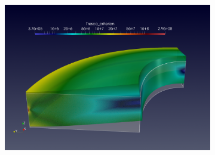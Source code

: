 \begin{figure}[h]
\begin{subfigure}[c]{0.49\textwidth}
    \includegraphics[width=\textwidth]{graphics/feelpp/feelpp-benchmark-nafems-le10-solution-tresca-wrap.png}
  \end{subfigure}
  \hfill
  \begin{subfigure}[c]{0.49\textwidth}

    \centering
    \captionsetup[subfigure]{justification=centering}

    \dataTableMeasures
    \def\myLineWidth{2pt}
    \def\myLineStyleA{loosely dashdotdotted} %
    \def\myLineStyleB{dashed}
    \def\myLineStyleC{solid}

    \def\myAddPlot#1#2#3#4{
      \addplot[#3,every mark/.append style={solid},
      x filter/.code={
        \pgfmathparse{\thisrow{PolyOrder}==#2}
        \ifnum0=\pgfmathresult
        \pgfmathsetmacro{\newx}{nan}
      \else
        \pgfmathsetmacro{\newx}{\thisrow{Mesh}}
      \fi
      \pgfmathparse{\newx}
    },
    y filter/.expression={ #4*\pgfmathresult }
    ] table [x=Mesh, y=#1] {\dataTableMeasures};
  }


\end{subfigure}
\end{figure}
